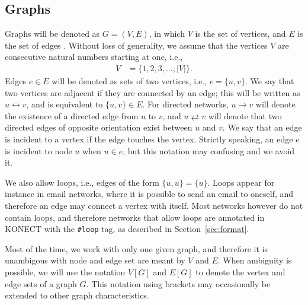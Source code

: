 \documentclass{article}
\begin{document}
\subsection{Graphs}
Graphs will be denoted as $G=(V,E)$, in which $V$ is the set of
vertices, and $E$ is the set of edges \citep{b116}. Without loss of
generality, we assume that the vertices $V$ are consecutive natural
numbers starting at one, i.e.,
\begin{align}
  V &= \{ 1, 2, 3, \dotsc, |V| \}.
\end{align}
Edges $e\in E$ will be denoted as sets of two vertices, i.e.,
$e=\{u,v\}$.  We say that two vertices are adjacent if they are
connected by an edge; this will be written as $u \leftrightarrow v$, and is equivalent to $\{u,v\}\in E$. 
For directed networks, $u \rightarrow v$ will denote the existence of a
directed edge from $u$ to $v$, and $u \rightleftarrows v$ will denote
that two directed edges of opposite orientation exist between $u$ and $v$.
We say that an
edge is incident to a vertex if the edge touches the vertex. Strictly
speaking, an edge $e$ is incident to node $u$ when $u\in e$, but this
notation may confusing and we avoid it. 

We also allow loops, i.e., edges of the form $\{u,u\}=\{u\}$.  Loops
appear for instance in email networks, where it is possible to send an
email to oneself, and therefore an edge may connect a vertex with
itself.  Most networks however do not contain loops, and therefore
networks that allow loops are annotated in KONECT with the 
\texttt{\#loop} tag, as described in Section~\ref{sec:format}. 

Most of the time, we work with only one given graph, and therefore it is
unambigous with node and edge set are meant by $V$ and $E$.  When
ambiguity is possible, we will use the notation
$V[G]$ and $E[G]$ to denote the vertex and edge sets of a graph $G$.
This notation using brackets may occasionally be extended to other graph
characteristics. 
\end{document}
